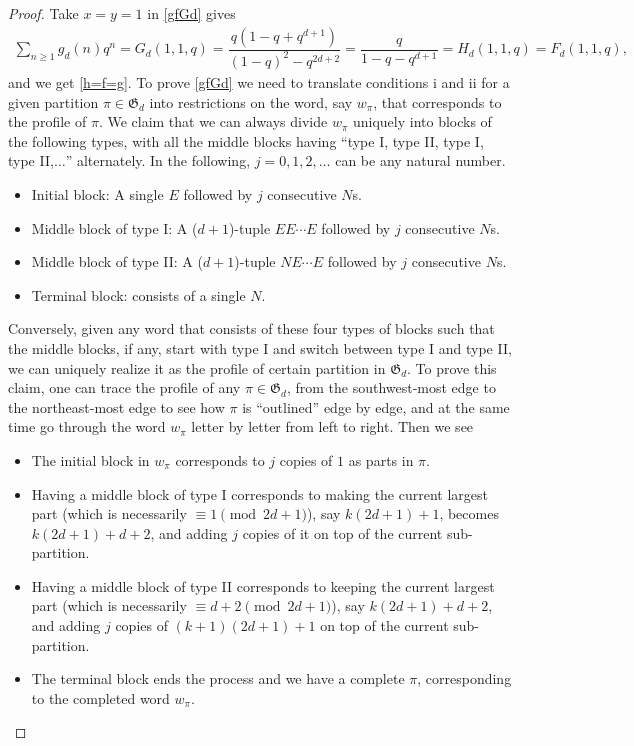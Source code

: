 \documentclass[12pt]{amsart}
\numberwithin{equation}{section}
\theoremstyle{plain}
\theoremstyle{definition}
\def\G{\mathfrak{G}}
\def\G{\mathcal{G}}
\def\G{\mathfrak{G}}
\begin{document}
\begin{proof}
Take $x=y=1$ in \eqref{gfGd} gives
\begin{align*}
\sum_{n\geq 1}g_d(n)q^n=G_d(1,1,q)=\dfrac{q(1-q+q^{d+1})}{(1-q)^2-q^{2d+2}}=\dfrac{q}{1-q-q^{d+1}}=H_d(1,1,q)=F_d(1,1,q),
\end{align*}
and we get \eqref{h=f=g}. To prove \eqref{gfGd} we need to translate conditions i and ii for a given partition $\pi\in\G_d$ into restrictions on the word, say $w_{\pi}$, that corresponds to the profile of $\pi$. We claim that we can always divide $w_{\pi}$ uniquely into blocks of the following types, with all the middle blocks having ``type I, type II, type I, type II,$\ldots$'' alternately. In the following, $j=0,1,2,\ldots$ can be any natural number.
\begin{itemize}
\item Initial block: A single $E$ followed by $j$ consecutive $N$s.
\item Middle block of type I: A ($d+1$)-tuple $EE\cdots E$ followed by $j$ consecutive $N$s.
\item Middle block of type II: A ($d+1$)-tuple $NE\cdots E$ followed by $j$ consecutive $N$s.
\item Terminal block: consists of a single $N$.
\end{itemize}
Conversely, given any word that consists of these four types of blocks such that the middle blocks, if any, start with type I and switch between type I and type II, we can uniquely realize it as the profile of certain partition in $\G_d$. To prove this claim, one can trace the profile of any $\pi\in\G_d$, from the southwest-most edge to the northeast-most edge to see how $\pi$ is ``outlined'' edge by edge, and at the same time go through the word $w_{\pi}$ letter by letter from left to right. Then we see
\begin{itemize}
\item The initial block in $w_{\pi}$ corresponds to $j$ copies of $1$ as parts in $\pi$.
\item Having a middle block of type I corresponds to making the current largest part (which is necessarily $\equiv 1 \pmod{2d+1}$), say $k(2d+1)+1$, becomes $k(2d+1)+d+2$, and adding $j$ copies of it on top of the current sub-partition.
\item Having a middle block of type II corresponds to keeping the current largest part (which is necessarily $\equiv d+2 \pmod{2d+1}$), say $k(2d+1)+d+2$, and adding $j$ copies of $(k+1)(2d+1)+1$ on top of the current sub-partition.
\item The terminal block ends the process and we have a complete $\pi$, corresponding to the completed word $w_{\pi}$.

\end{itemize}
\end{proof}
\end{document}
